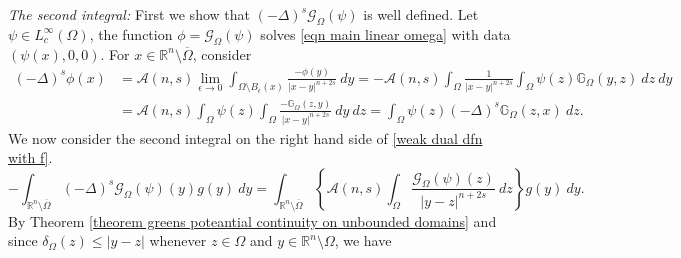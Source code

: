 \documentclass{amsart}
\newcommand{\R}{\mathbb{R}}
\newcommand{\slap}{(-\Delta)^{s}}
\newcommand{\g}[1]{\mathcal{G}_{#1}}
\newcommand{\gk}[1]{\mathbb{G}_{#1}}
\begin{document}
    \textit{The second integral:} First we show that $\slap \g{\Omega}(\psi)$ is well defined. Let $\psi\in L_{c}^{\infty}(\Omega)$, the function $\phi=\g{\Omega}(\psi)$ solves \eqref{eqn main linear omega} with data $(\psi(x),0,0)$.
 For $x\in \R^{n}\setminus\overline{\Omega}$, consider
 \begin{equation*}
 \begin{split}
     \slap \phi(x) &=\mathcal{A}(n,s) \lim_{\epsilon\to 0} \int_{\Omega\setminus B_{\epsilon}(x)}\frac{-\phi(y)}{|x-y|^{n+2s}}\ dy 
     =-\mathcal{A}(n,s)  \int_{\Omega}\frac{1}{|x-y|^{n+2s}}\int_{\Omega}\psi(z) \gk{\Omega}(y,z)\ dz\ dy\\
     &= \mathcal{A}(n,s)  \int_{\Omega}\psi(z)  \int_{\Omega}\frac{-\gk{\Omega}(z,y)}{|x-y|^{n+2s}}\ dy \ dz
     = \int_{\Omega}\psi(z) \slap \gk{\Omega}(z,x)\ dz.
      \end{split}
 \end{equation*}
 We now consider the second integral on the right hand side of \eqref{weak dual dfn with f}.
 \begin{equation*}
     -\int_{\R^{n}\setminus\overline{\Omega}
        }\slap \g{\Omega}(\psi)(y) g(y) \ dy=\int_{\R^{n}\setminus\overline{\Omega}
        }\left\{\mathcal{A}(n,s)\int_{\Omega}\frac{\g{\Omega}(\psi)(z)}{|y-z|^{n+2s}}\ dz\right\}g(y)\ dy.
 \end{equation*}
 By Theorem \ref{theorem greens poteantial continuity on unbounded domains} and since $\delta_{\Omega}(z)\leq |y-z|$ whenever $z\in \Omega$ and $y\in \R^{n}\setminus\Omega$, we have
\end{document}

